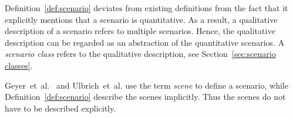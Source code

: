 Definition~\ref{def:scenario} deviates from existing definitions \cite{geyer2014, ulbrich2015, elrofai2016scenario} from the fact that it explicitly mentions that a scenario is quantitative. As a result, a qualitative description of a scenario refers to multiple scenarios. Hence, the qualitative description can be regarded as an abstraction of the quantitative scenarios. A \emph{scenario class} refers to the qualitative description, see Section~\ref{sec:scenario classes}.

Geyer~et~al.~\cite{geyer2014} and Ulbrich~et~al.\cite{ulbrich2015} use the term \emph{scene} to define a scenario, while Definition~\ref{def:scenario} describe the scenes implicitly. Thus the scenes do not have to be described explicitly.

